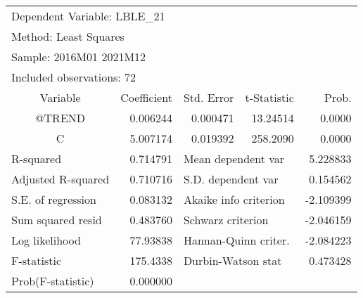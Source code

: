 \begin{tabular}{lrrrr}
\toprule
\multicolumn{2}{l}{Dependent Variable: LBLE\_21}&\multicolumn{1}{c}{}&\multicolumn{1}{c}{}&\multicolumn{1}{c}{}\\
\multicolumn{2}{l}{Method: Least Squares}&\multicolumn{1}{c}{}&\multicolumn{1}{c}{}&\multicolumn{1}{c}{}\\
\multicolumn{2}{l}{Sample: 2016M01 2021M12}&\multicolumn{1}{c}{}&\multicolumn{1}{c}{}&\multicolumn{1}{c}{}\\
\multicolumn{2}{l}{Included observations: 72}&\multicolumn{1}{c}{}&\multicolumn{1}{c}{}&\multicolumn{1}{c}{}\\
\midrule
\multicolumn{1}{c}{Variable}&\multicolumn{1}{r}{Coefficient}&\multicolumn{1}{r}{Std. Error}&\multicolumn{1}{r}{t-Statistic}&\multicolumn{1}{r}{Prob.}\\
\midrule
\multicolumn{1}{c}{@TREND}&\multicolumn{1}{r}{0.006244}&\multicolumn{1}{r}{0.000471}&\multicolumn{1}{r}{13.24514}&\multicolumn{1}{r}{0.0000}\\
\multicolumn{1}{c}{C}&\multicolumn{1}{r}{5.007174}&\multicolumn{1}{r}{0.019392}&\multicolumn{1}{r}{258.2090}&\multicolumn{1}{r}{0.0000}\\
\midrule
\multicolumn{1}{l}{R-squared}&\multicolumn{1}{r}{0.714791}&\multicolumn{2}{l}{Mean dependent var}&\multicolumn{1}{r}{5.228833}\\
\multicolumn{1}{l}{Adjusted R-squared}&\multicolumn{1}{r}{0.710716}&\multicolumn{2}{l}{S.D. dependent var}&\multicolumn{1}{r}{0.154562}\\
\multicolumn{1}{l}{S.E. of regression}&\multicolumn{1}{r}{0.083132}&\multicolumn{2}{l}{Akaike info criterion}&\multicolumn{1}{r}{-2.109399}\\
\multicolumn{1}{l}{Sum squared resid}&\multicolumn{1}{r}{0.483760}&\multicolumn{2}{l}{Schwarz criterion}&\multicolumn{1}{r}{-2.046159}\\
\multicolumn{1}{l}{Log likelihood}&\multicolumn{1}{r}{77.93838}&\multicolumn{2}{l}{Hannan-Quinn criter.}&\multicolumn{1}{r}{-2.084223}\\
\multicolumn{1}{l}{F-statistic}&\multicolumn{1}{r}{175.4338}&\multicolumn{2}{l}{Durbin-Watson stat}&\multicolumn{1}{r}{0.473428}\\
\multicolumn{1}{l}{Prob(F-statistic)}&\multicolumn{1}{r}{0.000000}&\multicolumn{1}{c}{}&\multicolumn{1}{c}{}&\multicolumn{1}{c}{}\\
\bottomrule
\end{tabular}
